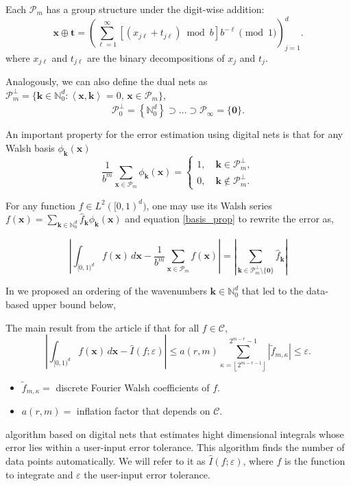 \documentclass[]{elsarticle}
\theoremstyle{definition}
\newcommand{\cube}{[0,1)^d}
\newcommand{\bvec}[1]{\boldsymbol{#1}}
\newcommand{\vx}{\bvec{x}}
\newcommand{\vt}{\bvec{t}}
\newcommand{\vk}{\bvec{k}}
\newcommand{\hf}{\hat{f}}
\newcommand{\tf}{\tilde{f}}
\newcommand{\vzero}{\bvec{0}}
\newcommand{\naturals}{\mathbb{N}}
\newcommand{\ip}[3][{}]{\ensuremath{\left \langle #2, #3 \right \rangle_{#1}}}
\def\abs#1{\ensuremath{\left \lvert #1 \right \rvert}}
\begin{document}
Each $\mathcal{P}_m$ has a group structure under the digit-wise addition:
\[
\vx\oplus\vt = \left(\sum_{\ell=1}^{\infty} [(x_{j\ell} + t_{j\ell}) \bmod b] b^{-\ell} \pmod{1} \right)_{j=1}^d.
\]
where $x_{j\ell}$ and $t_{j\ell}$ are the binary decompositions of $x_j$ and $t_j$.

 Analogously, we can also define the dual nets as $\mathcal{P}_m^\perp=\{\vk\in\mathbb{N}_0^d:\ip{\vx}{\vk}=0,\, \vx\in\mathcal{P}_m\}$,
\[
\mathcal{P}_0^\perp=\left\{\mathbb{N}_0^d\right\}\supset\dots\supset\mathcal{P}_\infty=\{\bvec{0}\}.
\]

An important property for the error estimation using digital nets is that for any Walsh basis $\phi_{\vk}(\vx)$
\begin{equation}\label{basis_prop}
\frac{1}{b^m}\sum_{\vx\in\mathcal{P}_m}\phi_{\vk}(\vx)=
\begin{cases}
1,\quad \vk\in\mathcal{P}_m^\perp, \\
0,\quad \vk\notin\mathcal{P}_m^\perp.
\end{cases}
\end{equation}

For any function $f\in L^2(\cube)$, one may use its Walsh series $f(\vx)=\sum_{\vk\in\naturals_0^d}\hf_{\vk}\phi_{\vk}(\vx)$ and equation \eqref{basis_prop} to rewrite the error as,


\[
\abs{\int_{\cube} f(\vx)\,d\vx - \frac{1}{b^m}\sum_{\vx\in\mathcal{P}_m}f(\vx)}=\abs{\sum_{\vk\in\mathcal{P}_m^\perp\setminus\{\vzero\}}\hf_{\vk}}
\]

In \cite{HicJim} we proposed an ordering of the wavenumbers $\vk\in\naturals_0^d$ that led to the data-based upper bound below,

The main result from the article if that for all $f\in\mathcal{C}$,
\[
\abs{\int_{\cube} f(\vx)\,d\vx - \widehat{I}(f;\varepsilon)}\leq a(r,m)\sum_{\kappa=\left \lfloor 2^{m-r-1}\right \rfloor}^{2^{m-r}-1} \abs{\tf_{m,\kappa}}\leq \varepsilon.
\]
\begin{itemize}
\item $\tf_{m,\kappa}=$ discrete Fourier Walsh coefficients of $f$.
\item $a(r,m)=$ inflation factor that depends on $\mathcal{C}$.
\end{itemize}

 algorithm based on digital nets that estimates hight dimensional integrals whose error lies within a user-input error tolerance. This algorithm finds the number of data points automatically. We will refer to it as $\widehat{I}(f;\varepsilon)$, where $f$ is the function to integrate and $\varepsilon$ the user-input error tolerance.
\end{document}
